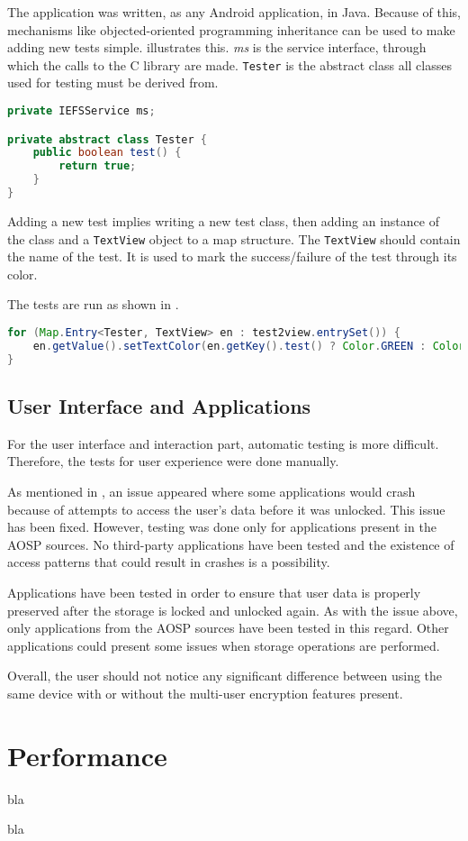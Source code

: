 The application was written, as any Android application, in Java. Because of this, mechanisms like objected-oriented programming inheritance can be used to make adding new tests simple.  illustrates this. \textit{ms} is the service interface, through which the calls to the C library are made. \texttt{Tester} is the abstract class all classes used for testing must be derived from.

\begin{lstlisting}[language=Java, caption=Tester class, label=lst:tester-eval]
private IEFSService ms;

private abstract class Tester {
    public boolean test() {
        return true;
    }
}
\end{lstlisting}

Adding a new test implies writing a new test class, then adding an instance of the class and a \texttt{TextView} object to a map structure. The \texttt{TextView} should contain the name of the test. It is used to mark the success/failure of the test through its color.

The tests are run as shown in .

\begin{lstlisting}[language=Java, numbers=none, caption=EFS Service tests, label=lst:run-eval]
for (Map.Entry<Tester, TextView> en : test2view.entrySet()) {
    en.getValue().setTextColor(en.getKey().test() ? Color.GREEN : Color.RED);
}
\end{lstlisting}

\subsection{User Interface and Applications}
\label{sub-sec:interf-apps-eval}

For the user interface and interaction part, automatic testing is more difficult. Therefore, the tests for user experience were done manually.

As mentioned in , an issue appeared where some applications would crash because of attempts to access the user's data before it was unlocked. This issue has been fixed. However, testing was done only for applications present in the AOSP sources. No third-party applications have been tested and the existence of access patterns that could result in crashes is a possibility.

Applications have been tested in order to ensure that user data is properly preserved after the storage is locked and unlocked again. As with the issue above, only applications from the AOSP sources have been tested in this regard. Other applications could present some issues when storage operations are performed.

Overall, the user should not notice any significant difference between using the same device with or without the multi-user encryption features present.

\section{Performance}
\label{sec:perf-eval}

bla

bla
